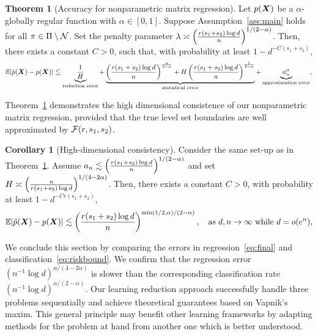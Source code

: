 \documentclass[11pt]{article}
\newcommand*{\KeepStyleUnderBrace}[1]{%
\mathop{%
\mathchoice
{\underbrace{\displaystyle#1}}%
{\underbrace{\textstyle#1}}%
{\underbrace{\scriptstyle#1}}%
{\underbrace{\scriptscriptstyle#1}}%
}\limits
}
\theoremstyle{definition}
\newtheorem{thm}{Theorem}[section]
\newtheorem{corollary}{Corollary}[section]
\newtheorem{example}{Example}
\def\fixme#1#2{\textbf{\color{red}[FIXME (#1): #2]}}
\begin{document}
\begin{thm}[Accuracy for nonparametric matrix regression]\label{thm:regression} Let $p(\bm X)$ be a $\alpha$-globally regular function with $\alpha\in[0,1]$. 
Suppose Assumption~\ref{ass:main} holds for all $\pi\in\Pi\setminus \mathcal{N}$. Set the penalty parameter $\lambda\asymp \left( r(s_1+s_2)\log d \over n\right)^{1/(2-\alpha)}$. Then, there exists a constant $C>0$, such that, with probability at least $1-d^{-C(s_1+s_2)}$,
\[
\mathbb{E}|\hat p(\mX)- p(\mX)| \lesssim \KeepStyleUnderBrace{{1\over H}}_{\text{reduction error}} +\KeepStyleUnderBrace{
\left({r(s_1+s_2)\log d\over n}\right)^{\alpha\over 2-\alpha}+H\left({r(s_1+s_2)\log d\over n}\right)^{1\over 2-\alpha}}_{\text{statistical error}} + \KeepStyleUnderBrace{a^\alpha_n}_{\text{approximation error}},
\]
\end{thm}

Theorem~\ref{thm:regression} demonstrates the high dimensional consistence of our nonparametric matrix regression, provided that the true level set boundaries are well approximated by  $\mathcal{F}(r,s_1,s_2)$.

\begin{corollary}[High-dimensional consistency] Consider the same set-up as in Theorem~\ref{thm:regression}. Assume $a_n \lesssim \left({r(s_1+s_2)\log d \over n}\right)^{1/(2-\alpha)}$ and set $H\asymp \left({n\over r(s_1+s_2) \log d}\right)^{1/(4-2\alpha)}$.
Then, there exists a constant $C>0$, with probability at least $1-d^{-Cr(s_1+s_2)}$, 
\begin{equation}\label{eq:final}
\mathbb{E}|\hat p(\bm X)- p(\bm X)| \lesssim \left({r(s_1+s_2)\log d \over n}\right)^{\min(1/2,\alpha)/(2-\alpha)}, \quad \text{as }d, n\to\infty \text{ while } d=o(e^{n}),
\end{equation}
\end{corollary}

We conclude this section by comparing the errors in regression~\eqref{eq:final} and classification~\eqref{eq:riskbound}. We confirm that the regression error $(n^{-1}\log d)^{\alpha/(4-2\alpha)}$ is slower than the corresponding classification rate $(n^{-1}\log d)^{\alpha/(2-\alpha)}$. Our learning reduction approach successfully handle three  problems sequentially and achieve theoretical guarantees based on Vapnik's maxim. This general principle may benefit other learning frameworks by adapting methods for the problem at hand from another one which is better understood.  

\end{document}
